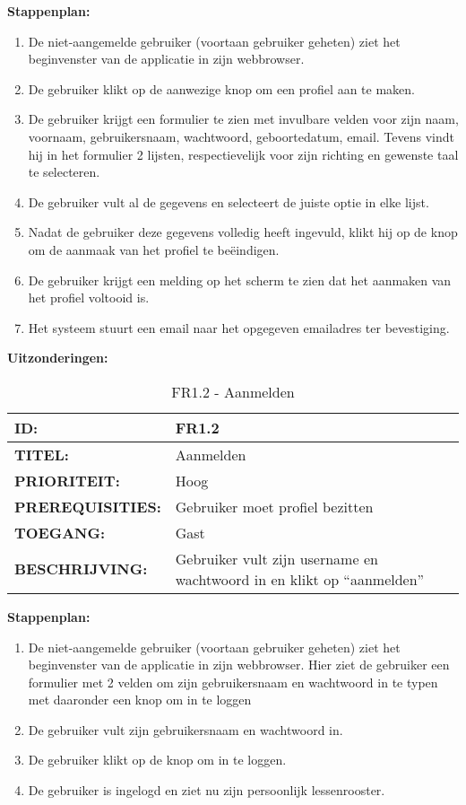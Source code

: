 \textbf{Stappenplan:}
\begin{enumerate}
\item De niet-aangemelde gebruiker (voortaan gebruiker geheten) ziet het beginvenster van de applicatie in zijn webbrowser.
\item De gebruiker klikt op de aanwezige knop om een profiel aan te maken.
\item De gebruiker krijgt een formulier te zien met invulbare velden voor zijn naam, voornaam, gebruikersnaam, wachtwoord, geboortedatum, email. Tevens vindt hij in het formulier 2 lijsten, respectievelijk voor zijn richting en gewenste taal te selecteren.
\item De gebruiker vult al de gegevens en selecteert de juiste optie in elke lijst.
\item Nadat de gebruiker deze gegevens volledig heeft ingevuld, klikt hij op de knop om de aanmaak van het profiel te beëindigen.
\item De gebruiker krijgt een melding op het scherm te zien dat het aanmaken van het profiel voltooid is.
\item Het systeem stuurt een email naar het opgegeven emailadres ter bevestiging.
\end{enumerate}

\textbf{Uitzonderingen:}

\noindent\begin{table}[H]
            \begin{tabular}{l | p{10cm}}
                \textbf{ID:} & FR1.2 \\ \hline
                \textbf{TITEL:} & Aanmelden \\ \hline
                \textbf{PRIORITEIT:} &  Hoog \\ \hline
                \textbf{PREREQUISITIES:} & Gebruiker moet profiel bezitten\\ \hline
                \textbf{TOEGANG:} &  Gast \\ \hline
                \textbf{BESCHRIJVING:} & Gebruiker vult zijn username en wachtwoord in en klikt op “aanmelden”\\
            \end{tabular}
            \caption{FR1.2 - Aanmelden}
            \label{tab:FR1.2 - Aanmelden}
        \end{table}
        
\textbf{Stappenplan:}
\begin{enumerate}
\item De niet-aangemelde gebruiker (voortaan gebruiker geheten) ziet het beginvenster van de applicatie in zijn webbrowser. Hier ziet de gebruiker een formulier met 2 velden om zijn gebruikersnaam en wachtwoord in te typen met daaronder een knop om in te loggen
\item De gebruiker vult zijn gebruikersnaam en wachtwoord in.
\item De gebruiker klikt op de knop om in te loggen.
\item De gebruiker is ingelogd en ziet nu zijn persoonlijk lessenrooster.
\end{enumerate}

